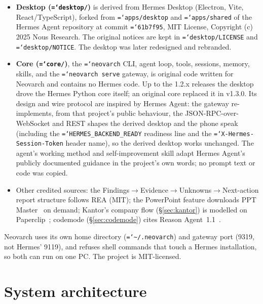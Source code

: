 \documentclass[11pt]{article}
\newcommand{\code}[1]{\texttt{\hyphenchar\font=`\-\relax #1}}
\begin{document}
\begin{itemize}
\item \textbf{Desktop (\code{desktop/})} is derived from Hermes Desktop (Electron, Vite, React/TypeScript), forked from
  \code{apps/desktop} and \code{apps/shared} of the Hermes Agent repository at commit \code{61b7f95}, MIT License, Copyright (c) 2025
  Nous Research. The original notices are kept in \code{desktop/LICENSE} and \code{desktop/NOTICE}. The desktop was later redesigned
  and rebranded.
\item \textbf{Core (\code{core/})}, the \code{neovarch} CLI, agent loop, tools, sessions, memory, skills, and the
  \code{neovarch serve} gateway, is original code written for Neovarch and contains no Hermes code. Up to the 1.2.x
  releases the desktop drove the Hermes Python core itself; an original core replaced it in v1.3.0. Its design and wire protocol are inspired by Hermes
  Agent: the gateway re-implements, from that project's public behaviour, the JSON-RPC-over-WebSocket and REST shapes the derived desktop and the phone speak
  (including the \code{HERMES\_BACKEND\_READY} readiness line and the \code{X-Hermes-Session-Token} header name), so the derived desktop works unchanged.
  The agent's working method and self-improvement skill adapt Hermes Agent's publicly documented guidance in the project's own words;
  no prompt text or code was copied.
\item Other credited sources: the Findings$\to$Evidence$\to$Unknowns$\to$Next-action report structure follows REA (MIT); the PowerPoint
  feature downloads PPT Master~\citep{pptmaster} on demand; Kantor's company flow (\S\ref{sec:kantor}) is modelled on Paperclip~\citep{paperclip};
  codemode (\S\ref{sec:codemode}) cites Reason Agent~1.1~\citep{reasonagent11}.
\end{itemize}

\noindent Neovarch uses its own home directory (\code{\textasciitilde/.neovarch}) and gateway port (9319, not Hermes' 9119), and
refuses shell commands that touch a Hermes installation, so both can run on one PC. The project is MIT-licensed.

\section{System architecture}
\label{sec:arch}
\end{document}
